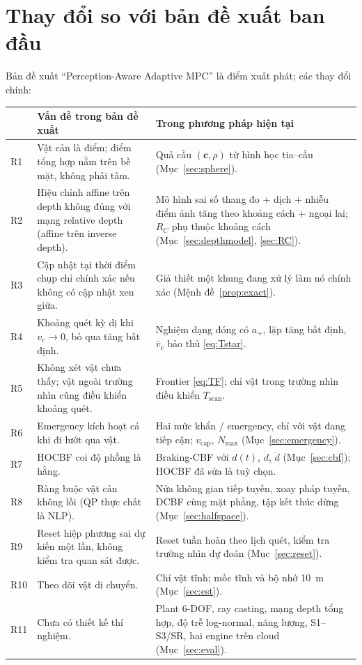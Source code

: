 \documentclass[11pt,a4paper]{article}
\numberwithin{equation}{section}
\newcommand{\vb}[1]{\bm{#1}}
\theoremstyle{definition}
\theoremstyle{plain}
\theoremstyle{remark}
\begin{document}
\section{Thay đổi so với bản đề xuất ban đầu}
\label{app:changes}
Bản đề xuất ``Perception-Aware Adaptive MPC'' là điểm xuất phát; các thay đổi chính:
{\footnotesize
\begin{longtable}{@{}p{0.6cm}p{5.2cm}p{9.2cm}@{}}
\toprule
 & Vấn đề trong bản đề xuất & Trong phương pháp hiện tại \\ \midrule\endhead
R1 & Vật cản là điểm; điểm tổng hợp nằm trên bề mặt, không phải tâm. & Quả cầu $(\vb c,\rho)$ từ hình học tia--cầu (Mục~\ref{sec:sphere}). \\
R2 & Hiệu chỉnh affine trên depth không đúng với mạng relative depth (affine trên inverse depth). & Mô hình sai số thang đo + dịch + nhiễu điểm ảnh tăng theo khoảng cách + ngoại lai; $R_C$ phụ thuộc khoảng cách (Mục~\ref{sec:depthmodel}, \ref{sec:RC}). \\
R3 & Cập nhật tại thời điểm chụp chỉ chính xác nếu không có cập nhật xen giữa. & Giả thiết một khung đang xử lý làm nó chính xác (Mệnh đề~\ref{prop:exact}). \\
R4 & Khoảng quét kỳ dị khi $v_c\to0$, bỏ qua tăng bất định. & Nghiệm dạng đóng có $a_+$, lặp tăng bất định, $\bar v_c$ bảo thủ \eqref{eq:Tstar}. \\
R5 & Không xét vật chưa thấy; vật ngoài trường nhìn cũng điều khiển khoảng quét. & Frontier \eqref{eq:TF}; chỉ vật trong trường nhìn điều khiển $T_{\text{scan}}$. \\
R6 & Emergency kích hoạt cả khi đi lướt qua vật. & Hai mức khẩn / emergency, chỉ với vật đang tiếp cận; $v_{\text{cap}}$, $N_{\max}$ (Mục~\ref{sec:emergency}). \\
R7 & HOCBF coi độ phồng là hằng. & Braking-CBF với $d(t)$, $\dot d$, $\ddot d$ (Mục~\ref{sec:cbf}); HOCBF đã sửa là tuỳ chọn. \\
R8 & Ràng buộc vật cản không lồi (QP thực chất là NLP). & Nửa không gian tiếp tuyến, xoay pháp tuyến, DCBF cùng mặt phẳng, tập kết thúc dừng (Mục~\ref{sec:halfspace}). \\
R9 & Reset hiệp phương sai dự kiến một lần, không kiểm tra quan sát được. & Reset tuần hoàn theo lịch quét, kiểm tra trường nhìn dự đoán (Mục~\ref{sec:reset}). \\
R10 & Theo dõi vật di chuyển. & Chỉ vật tĩnh; mốc tĩnh và bộ nhớ 10~m (Mục~\ref{sec:est}). \\
R11 & Chưa có thiết kế thí nghiệm. & Plant 6-DOF, ray casting, mạng depth tổng hợp, độ trễ log-normal, năng lượng, S1--S3/SR, hai engine trên cloud (Mục~\ref{sec:eval}). \\

\end{longtable}}
\end{document}
